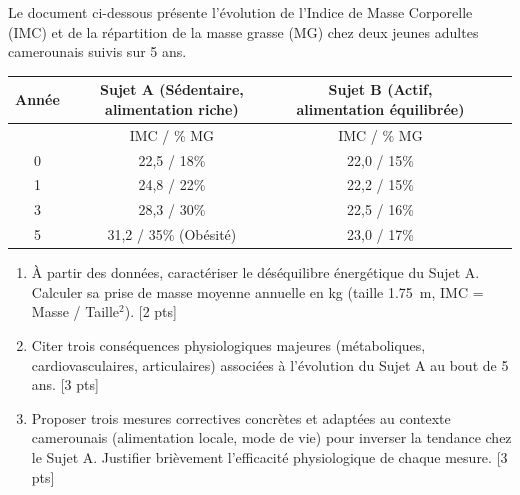 \documentclass[11pt]{article}
\begin{document}
\begin{exercice}
Le document ci-dessous présente l'évolution de l'Indice de Masse Corporelle (IMC) et de la répartition de la masse grasse (MG) chez deux jeunes adultes camerounais suivis sur 5 ans.
\begin{center}
\begin{tabular}{|c|c|c|c|c|}
\hline
\textbf{Année} & \textbf{Sujet A (Sédentaire, alimentation riche)} & \textbf{Sujet B (Actif, alimentation équilibrée)} \\ \hline
& IMC / $\%$ MG & IMC / $\%$ MG \\ \hline
0 & 22,5 / 18\% & 22,0 / 15\% \\ \hline
1 & 24,8 / 22\% & 22,2 / 15\% \\ \hline
3 & 28,3 / 30\% & 22,5 / 16\% \\ \hline
5 & 31,2 / 35\% (Obésité) & 23,0 / 17\% \\ \hline
\end{tabular}
\end{center}
\begin{enumerate}
    \item À partir des données, caractériser le déséquilibre énergétique du Sujet A. Calculer sa prise de masse moyenne annuelle en kg (taille \SI{1.75}{m}, IMC = Masse / Taille$^2$). [2 pts]
    \item Citer trois conséquences physiologiques majeures (métaboliques, cardiovasculaires, articulaires) associées à l'évolution du Sujet A au bout de 5 ans. [3 pts]
    \item Proposer trois mesures correctives concrètes et adaptées au contexte camerounais (alimentation locale, mode de vie) pour inverser la tendance chez le Sujet A. Justifier brièvement l'efficacité physiologique de chaque mesure. [3 pts]
\end{enumerate}
\end{exercice}
\end{document}
